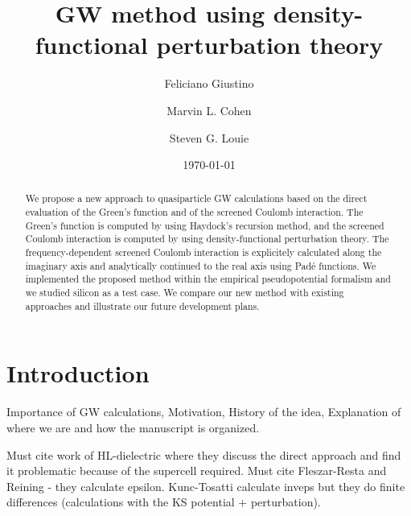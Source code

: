 \documentclass[twocolumn,prb,showpacs,superscriptaddress]{revtex4}
\begin{document}
\title{GW method using density-functional perturbation theory}

\author{Feliciano Giustino}
\author{Marvin L. Cohen}
\author{Steven G. Louie}
\date{\today}

\begin{abstract}
We propose a new approach to quasiparticle GW calculations based on the
direct evaluation of the Green's function and of the screened Coulomb interaction.
The Green's function is computed by using Haydock's recursion method,
and the screened Coulomb interaction is computed by using density-functional
perturbation theory. The frequency-dependent screened Coulomb interaction 
is explicitely calculated along the imaginary axis and analytically continued 
to the real axis using Pad\'e functions. We implemented the
proposed method within the empirical pseudopotential formalism and 
we studied silicon as a test case. We compare our new method with existing
approaches and illustrate our future development plans.
\end{abstract}


\maketitle

\section{Introduction}

Importance of GW calculations, Motivation, History of the idea,
Explanation of where we are and how the manuscript is organized.

Must cite work of HL-dielectric where they discuss the direct approach
and find it problematic because of the supercell required.
Must cite Fleszar-Resta and Reining - they calculate epsilon.
Kunc-Tosatti calculate inveps but they do finite differences
(calculations with the KS potential + perturbation).
\end{document}
